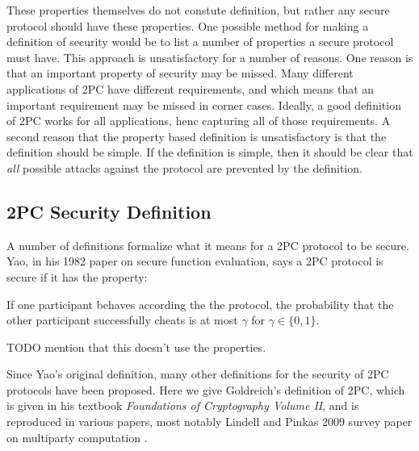 These properties themselves do not constute definition, but rather any secure protocol should have these properties.
One possible method for making a definition of security would be to list a number of properties a secure protocol must have.
This approach is unsatisfactory for a number of reasons.
One reason is that an important property of security may be missed.
Many different applications of 2PC have different requirements, and which means that an important requirement may be missed in corner cases.
Ideally, a good definition of 2PC works for all applications, henc capturing all of those requirements.
A second reason that the property based definition is unsatisfactory is that the definition should be simple.
If the definition is simple, then it should be clear that \textit{all} possible attacks against the protocol are prevented by the definition.

\subsection{2PC Security Definition}
A number of definitions formalize what it means for a 2PC protocol to be secure.
Yao, in his 1982 paper on secure function evaluation, says a 2PC protocol is secure if it has the property:

\begin{blockquote}
If one participant behaves according the the protocol, the probability that the other participant successfully cheats is at most $\gamma$ for $\gamma \in \{0,1\}$.
\end{blockquote}

TODO mention that this doesn't use the properties.

Since Yao's original definition, many other definitions for the security of 2PC protocols have been proposed.
Here we give Goldreich's definition of 2PC, which is given in his textbook \textit{Foundations of Cryptography Volume II}, and is reproduced in various papers, most notably Lindell and Pinkas 2009 survey paper on multiparty computation \cite{goldreich2, lindell2009}.


